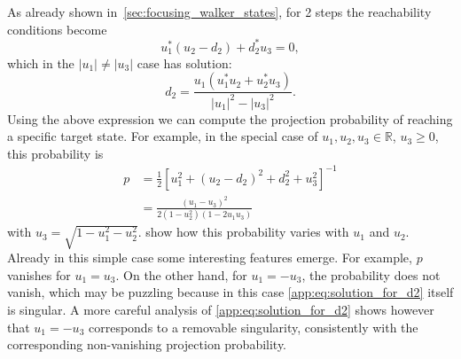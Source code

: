As already shown in~\cref{sec:focusing_walker_states}, for 2 steps the reachability conditions become
\begin{equation}
	u_1^* (u_2 - d_2) + d_2^* u_3 = 0,
	\label{eq:reachability_condition_2steps}
\end{equation}
which in the $\lvert u_1 \rvert \neq \lvert u_3 \rvert$ case has solution:
\begin{equation}
	d_2 = \frac{
		u_1(u_1^* u_2 + u_2^* u_3)
	}{
		\lvert u_1 \rvert^2 - \lvert u_3 \rvert^2
	}.
	\label{app:eq:solution_for_d2}
\end{equation}
Using the above expression we can compute the projection probability of reaching a specific target state.
For example, in the special case of $u_1, u_2, u_3 \in \mathbb R$, $u_3 \ge 0$, this probability is
\begin{equation}
\begin{aligned}
	p &= \frac{1}{2} \left[ u_1^2 + (u_2 - d_2)^2 + d_2^2 + u_3^2 \right]^{-1} \\
	&= \frac{
		\left( u_1 - u_3 \right)^2
	}{
		2(1 - u_2^2)(1 - 2 u_1 u_3)
	}
\end{aligned}
\label{eq:proj_prob_2steps}
\end{equation}
with $u_3 = \sqrt{1 - u_1^2 - u_2^2}$.
 show how this probability varies with $u_1$ and $u_2$.
Already in this simple case some interesting features emerge. For example, $p$ vanishes for $u_1 = u_3$.
On the other hand, for $u_1 = -u_3$, the probability does not vanish, which may be puzzling because in this case \cref{app:eq:solution_for_d2} itself is singular.
A more careful analysis of \cref{app:eq:solution_for_d2} shows however that $u_1 = -u_3$ corresponds to a removable singularity, consistently with the corresponding non-vanishing projection probability.


